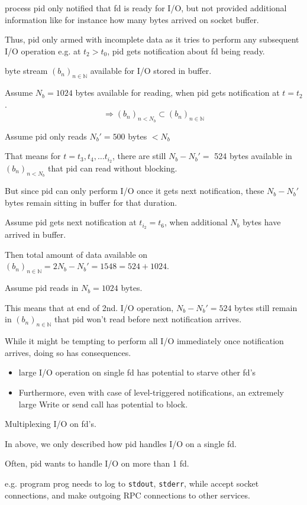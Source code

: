 \documentclass[10pt]{amsart}
\begin{document}
process pid only notified that fd is ready for I/O, but not provided additional information like for instance how many bytes arrived on socket buffer.

Thus, pid only armed with incomplete data as it tries to perform any subsequent I/O operation 
e.g. 
at $t_2 > t_0$, pid gets notification about fd being ready.

byte stream $(b_n)_{n\in \mathbb{N}}$ available for I/O stored in buffer.

Assume $N_b = 1024$ bytes available for reading, when pid gets notification at $t= t_2$. 
\[
\Longrightarrow (b_n)_{n <N_b} \subset (b_n)_{n\in \mathbb{N}}
\]

Assume pid only reads $N_b' = 500$ bytes $<N_b$

That means for $t=t_3, t_4, \dots t_{i_2}$, there are still $N_b - N_b' = $ 524 bytes available in $(b_n)_{n < N_b}$ that pid can read without blocking.

But since pid can only perform I/O once it gets next notification, these $N_b - N_b'$ bytes remain sitting in buffer for that duration.

Assume pid gets next notification at $t_{i_2} = t_6$, when additional $N_b$ bytes have arrived in buffer.

Then total amount of data available on $(b_n)_{n\in \mathbb{N}} = 2N_b - N_b' = 1548 = 524 + 1024$.

Assume pid reads in $N_b = 1024$ bytes.

This means that at end of 2nd. I/O operation, $N_b - N_b' = 524$ bytes still remain in $(b_n)_{n\in \mathbb{N}}$ that pid won't read before next notification arrives.

While it might be tempting to perform all I/O immediately once notification arrives, doing so has consequences. 
\begin{itemize}
	\item large I/O operation on single fd has potential to starve other fd's 
	\item Furthermore, even with case of level-triggered notifications, an extremely large Write or send call has potential to block.
\end{itemize}

Multiplexing I/O on fd's.

In above, we only described how pid handles I/O on a single fd.

Often, pid wants to handle I/O on more than 1 fd.

e.g. program prog needs to log to \texttt{stdout}, \texttt{stderr}, while accept socket connections, and make outgoing RPC connections to other services. 
\end{document}
